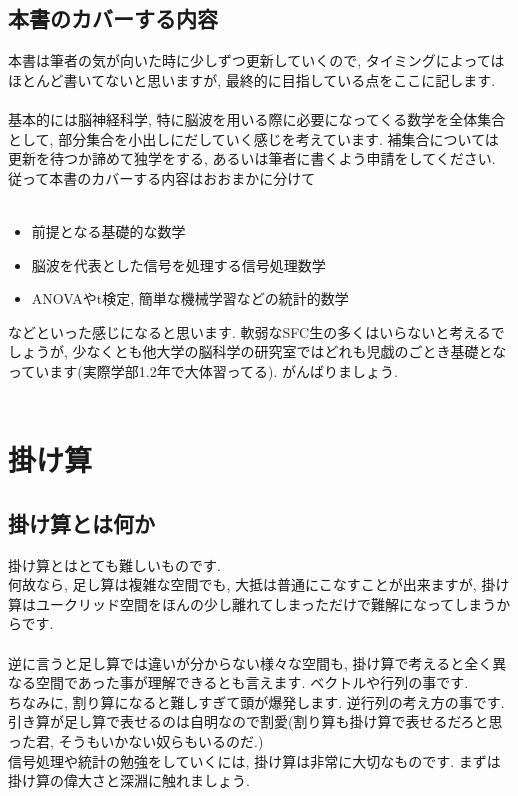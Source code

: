 \documentclass[11pt,a4paper]{jreport}
\begin{document}
\section{本書のカバーする内容}
本書は筆者の気が向いた時に少しずつ更新していくので, タイミングによってはほとんど書いてないと思いますが, 最終的に目指している点をここに記します.\\
\\
基本的には脳神経科学, 特に脳波を用いる際に必要になってくる数学を全体集合として, 部分集合を小出しにだしていく感じを考えています. 補集合については更新を待つか諦めて独学をする, あるいは筆者に書くよう申請をしてください. 従って本書のカバーする内容はおおまかに分けて\\
\\
\begin{itemize}
 \item 前提となる基礎的な数学
 \item 脳波を代表とした信号を処理する信号処理数学
 \item ANOVAやt検定, 簡単な機械学習などの統計的数学
\end{itemize}

などといった感じになると思います. 軟弱なSFC生の多くはいらないと考えるでしょうが, 少なくとも他大学の脳科学の研究室ではどれも児戯のごとき基礎となっています(実際学部1.2年で大体習ってる). がんばりましょう.
\\
\\
\chapter{掛け算}
\section{掛け算とは何か}
掛け算とはとても難しいものです.\\
何故なら, 足し算は複雑な空間でも, 大抵は普通にこなすことが出来ますが, 掛け算はユークリッド空間をほんの少し離れてしまっただけで難解になってしまうからです. \\
\\
逆に言うと足し算では違いが分からない様々な空間も, 掛け算で考えると全く異なる空間であった事が理解できるとも言えます. ベクトルや行列の事です.\\
ちなみに, 割り算になると難しすぎて頭が爆発します. 逆行列の考え方の事です. \\
引き算が足し算で表せるのは自明なので割愛(割り算も掛け算で表せるだろと思った君, そうもいかない奴らもいるのだ.)\\
信号処理や統計の勉強をしていくには, 掛け算は非常に大切なものです. まずは掛け算の偉大さと深淵に触れましょう.\\
\\
\end{document}
